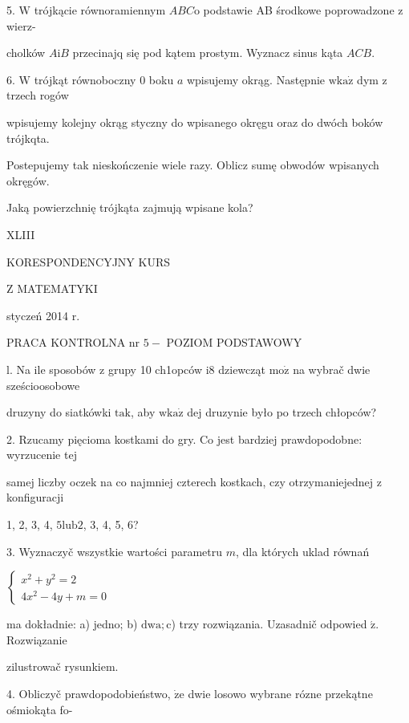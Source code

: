 \documentclass[a4paper,12pt]{article}
\begin{document}
5. $\mathrm{W}$ trójkącie równoramiennym $ABC\mathrm{o}$ podstawie AB środkowe poprowadzone $\mathrm{z}$ wierz-

cholków $A\mathrm{i}B$ przecinajq się pod kątem prostym. Wyznacz sinus kąta $ACB.$

6. $\mathrm{W}$ trójkąt równoboczny $0$ boku $a$ wpisujemy okrąg. Następnie $\mathrm{w}\mathrm{k}\mathrm{a}\dot{\mathrm{z}}$ dym $\mathrm{z}$ trzech rogów

wpisujemy kolejny okrąg styczny do wpisanego okręgu oraz do dwóch boków trójkqta.

Postepujemy tak nieskończenie wiele razy. Oblicz sumę obwodów wpisanych okręgów.

Jaką powierzchnię trójkąta zajmują wpisane kola?





XLIII

KORESPONDENCYJNY KURS

Z MATEMATYKI

styczeń 2014 r.

PRACA KONTROLNA nr $5-$ POZIOM PODSTAWOWY

l. Na ile sposobów $\mathrm{z}$ grupy 10 ch1opców $\mathrm{i}8$ dziewcząt $\mathrm{m}\mathrm{o}\dot{\mathrm{z}}$ na wybrač dwie sześcioosobowe

druzyny do siatkówki $\mathrm{t}\mathrm{a}\mathrm{k}$, aby $\mathrm{w}\mathrm{k}\mathrm{a}\dot{\mathrm{z}}$ dej druzynie było po trzech chłopców?

2. Rzucamy pięcioma kostkami do gry. Co jest bardziej prawdopodobne: wyrzucenie tej

samej liczby oczek na co najmniej czterech kostkach, czy otrzymaniejednej $\mathrm{z}$ konfiguracji

1, 2, 3, 4, $5\mathrm{l}\mathrm{u}\mathrm{b}2$, 3, 4, 5, 6?

3. Wyznaczyč wszystkie wartości parametru $m$, dla których uklad równań

$\left\{\begin{array}{l}
x^{2}+y^{2}=2\\
4x^{2}-4y+m=0
\end{array}\right.$

ma dokładnie: a) jedno; b) $\mathrm{d}\mathrm{w}\mathrm{a};\mathrm{c}$) trzy rozwiązania. Uzasadnič odpowied $\acute{\mathrm{z}}$. Rozwiązanie

zilustrowač rysunkiem.

4. Obliczyč prawdopodobieństwo, $\dot{\mathrm{z}}\mathrm{e}$ dwie losowo wybrane rózne przekątne ośmiokąta fo-
\end{document}
